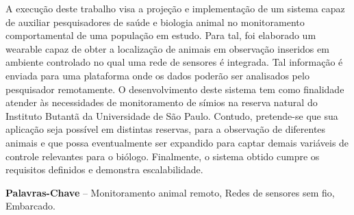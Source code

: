 \begin{resumo}
A execução deste trabalho visa a projeção e implementação de um sistema capaz de auxiliar pesquisadores de saúde e biologia animal no monitoramento comportamental de uma população em estudo. Para tal, foi elaborado um wearable capaz de obter a localização de animais em observação inseridos em ambiente controlado no qual uma rede de sensores é integrada. Tal informação é enviada para uma plataforma onde os dados poderão ser analisados pelo pesquisador remotamente. O desenvolvimento deste sistema tem como finalidade atender às necessidades de monitoramento de símios na reserva natural do Instituto Butantã da Universidade de São Paulo. Contudo, pretende-se que sua aplicação seja possível em distintas reservas, para a observação de diferentes animais e que possa eventualmente ser expandido para captar demais variáveis de controle relevantes para o biólogo. Finalmente, o sistema obtido cumpre os requisitos definidos e demonstra escalabilidade.

\textbf{Palavras-Chave} -- Monitoramento animal remoto, Redes de sensores sem fio, Embarcado.
\end{resumo}